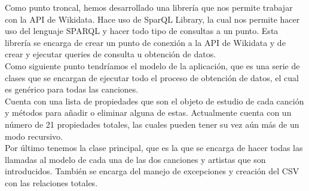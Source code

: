 Como punto troncal, hemos desarrollado una librería que nos permite trabajar con la API de Wikidata. Hace uso de SparQL Library, la cual nos permite hacer uso del lenguaje SPARQL y hacer todo tipo de consultas a un punto. Esta librería se encarga de crear un punto de conexión a la API de Wikidata y de crear y ejecutar queries de consulta u obtención de datos.\\

Como siguiente punto tendríamos el modelo de la aplicación, que es una serie de clases que se encargan de ejecutar todo el proceso de obtención de datos, el cual es genérico para todas las canciones.\\

Cuenta con una lista de propiedades que son el objeto de estudio de cada canción y métodos para añadir o eliminar alguna de estas. Actualmente cuenta con un número de 21 propiedades totales, las cuales pueden tener su vez aún más de un modo recursivo.\\

Por último tenemos la clase principal, que es la que se encarga de hacer todas las llamadas al modelo de cada una de las dos canciones y artistas que son introducidos. También se encarga del manejo de excepciones y creación del CSV con las relaciones totales.\\
